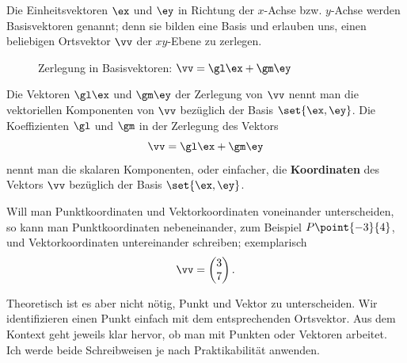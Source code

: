\documentclass[%
11pt,%
twoside,%
titlepage,%
german,%
headsepline%
]{scrartcl}
\begin{document}
Die Einheitsvektoren $\ex$ und $\ey$ in Richtung der $x$-Achse bzw. $y$-Achse werden Basisvektoren genannt; denn sie bilden eine Basis und erlauben uns, einen beliebigen Ortsvektor $\vv$ der $xy$-Ebene zu \glqq zerlegen\grqq.
\begin{figure}[ht]
\begin{center}
\end{center}
\caption{Zerlegung in Basisvektoren: $\vv=\gl\ex+\gm\ey$}
\end{figure}
Die Vektoren $\gl\ex$ und $\gm\ey$ der Zerlegung von $\vv$ nennt man die vektoriellen Komponenten von $\vv$ bezüglich der Basis $\set{\ex,\ey}$.
Die Koeffizienten $\gl$ und $\gm$ in der Zerlegung des Vektors
$$\vv=\gl\ex+\gm\ey$$
nennt man die skalaren Komponenten, oder einfacher, die \textbf{Koordinaten} des Vektors $\vv$ bezüglich der Basis $\set{\ex,\ey}$.

\begin{bem}
Will man Punkt\-koordi\-naten und Vektor\-koordi\-naten voneinander unterscheiden, so kann man Punkt\-koordi\-naten nebeneinander, zum Beispiel $P\point{-3}{4}$, und  Vektor\-koordi\-naten untereinander schreiben; exemplarisch
$$\vv=\begin{pmatrix}3\\7\end{pmatrix}.$$

Theoretisch ist es aber nicht nötig, Punkt und Vektor zu unterscheiden. Wir identifizieren einen Punkt einfach mit dem entsprechenden Ortsvektor. Aus dem Kontext geht jeweils klar hervor, ob man mit Punkten oder Vektoren arbeitet. Ich werde beide Schreibweisen je nach Praktikabilität anwenden.
\end{bem}
\end{document}
